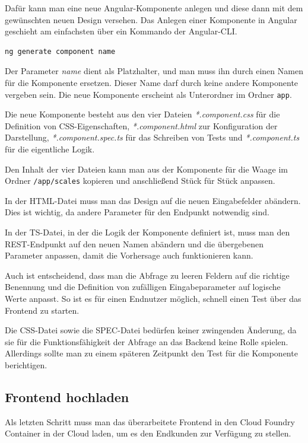Dafür kann man eine neue Angular-Komponente anlegen und diese dann mit dem gewünschten neuen Design versehen. Das
Anlegen einer Komponente in Angular geschieht am einfachsten über ein Kommando der Angular-CLI.

\begin{lstlisting}[caption=Erstellen einer neuen Komponente, label=ls:schlauchbeutelmaschine_component]
    ng generate component name
\end{lstlisting}

Der Parameter \textit{name} dient als Platzhalter, und man muss ihn durch einen Namen für die Komponente ersetzen. Dieser
Name darf durch keine andere Komponente vergeben sein. Die neue Komponente erscheint als Unterordner im Ordner
\texttt{app}.

Die neue Komponente besteht aus den vier Dateien \textit{*.component.css} für die Definition von CSS-Eigenschaften,
\textit{*.component.html} zur Konfiguration der Darstellung, \textit{*.component.spec.ts} für das Schreiben von Tests
und \textit{*.component.ts} für die eigentliche Logik.

Den Inhalt der vier Dateien kann man aus der Komponente für die Waage im Ordner \texttt{/app/scales} kopieren und
anschließend Stück für Stück anpassen.

In der HTML-Datei muss man das Design auf die neuen Eingabefelder abändern. Dies ist wichtig, da andere Parameter für
den Endpunkt notwendig sind.

In der TS-Datei, in der die Logik der Komponente definiert ist, muss man den REST-Endpunkt auf den neuen Namen abändern
und die übergebenen Parameter anpassen, damit die Vorhersage auch funktionieren kann.

Auch ist entscheidend, dass man die Abfrage zu leeren Feldern auf die richtige Benennung und die Definition von
zufälligen Eingabeparameter auf logische Werte anpasst. So ist es für einen Endnutzer möglich, schnell einen Test über
das Frontend zu starten.

Die CSS-Datei sowie die SPEC-Datei bedürfen keiner zwingenden Änderung, da sie für die Funktionsfähigkeit der Abfrage an
das Backend keine Rolle spielen. Allerdings sollte man zu einem späteren Zeitpunkt den Test für die Komponente
berichtigen.

\subsection{Frontend hochladen}
Als letzten Schritt muss man das überarbeitete Frontend in den Cloud Foundry Container in der Cloud laden, um es den
Endkunden zur Verfügung zu stellen.

